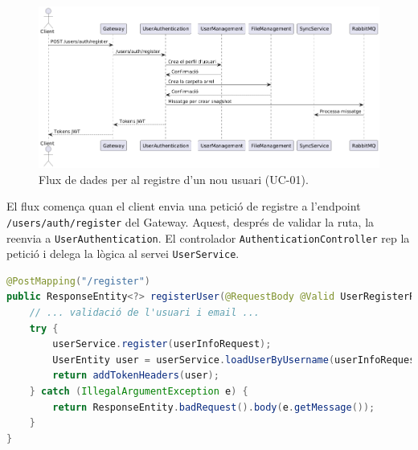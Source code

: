 \begin{figure}[H]
    \centering
    \includegraphics[width=1\textwidth]{Figures/flux/register_user.png}
    \caption{Flux de dades per al registre d'un nou usuari (UC-01).}
\end{figure}

El flux comença quan el client envia una petició de registre a l'endpoint \texttt{/users/auth/register} del Gateway. Aquest, després de validar la ruta, la reenvia a \texttt{UserAuthentication}. El controlador \texttt{AuthenticationController} rep la petició i delega la lògica al servei \texttt{UserService}.

\begin{lstlisting}[language=Java, caption={Endpoint de registre a `AuthenticationController`}]
@PostMapping("/register")
public ResponseEntity<?> registerUser(@RequestBody @Valid UserRegisterRequest userInfoRequest, HttpServletResponse response) {
    // ... validació de l'usuari i email ...
    try {
        userService.register(userInfoRequest);
        UserEntity user = userService.loadUserByUsername(userInfoRequest.getUsername());
        return addTokenHeaders(user);
    } catch (IllegalArgumentException e) {
        return ResponseEntity.badRequest().body(e.getMessage());
    }
}
\end{lstlisting}

